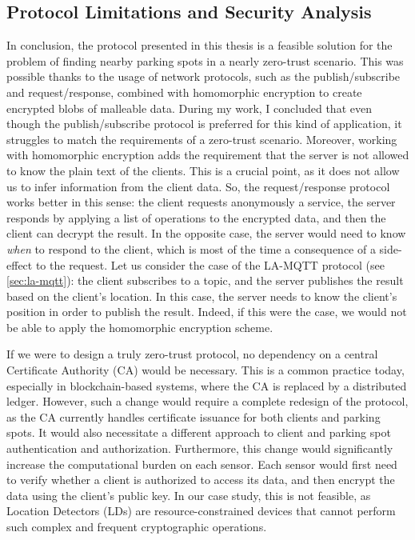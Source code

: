 \subsection{Protocol Limitations and Security Analysis}

In conclusion, the protocol presented in this thesis is a feasible solution for the problem of finding nearby parking spots in a nearly zero-trust scenario. This was possible thanks to the usage of network protocols, such as the publish/subscribe and request/response, combined with homomorphic encryption to create encrypted blobs of malleable data. 
During my work, I concluded that even though the publish/subscribe protocol is preferred for this kind of application, it struggles to match the requirements of a zero-trust scenario. Moreover, working with homomorphic encryption adds the requirement that the server is not allowed to know the plain text of the clients. This is a crucial point, as it does not allow us to infer information from the client data. So, the request/response protocol works better in this sense: the client requests anonymously a service, the server responds by applying a list of operations to the encrypted data, and then the client can decrypt the result. In the opposite case, the server would need to know \emph{when} to respond to the client, which is most of the time a consequence of a side-effect to the request. Let us consider the case of the LA-MQTT protocol (see \cref{sec:la-mqtt}): the client subscribes to a topic, and the server publishes the result based on the client's location. In this case, the server needs to know the client's position in order to publish the result. Indeed, if this were the case, we would not be able to apply the homomorphic encryption scheme.

If we were to design a truly zero-trust protocol, no dependency on a central Certificate Authority (CA) would be necessary. This is a common practice today, especially in blockchain-based systems, where the CA is replaced by a distributed ledger. However, such a change would require a complete redesign of the protocol, as the CA currently handles certificate issuance for both clients and parking spots. It would also necessitate a different approach to client and parking spot authentication and authorization.
Furthermore, this change would significantly increase the computational burden on each sensor. Each sensor would first need to verify whether a client is authorized to access its data, and then encrypt the data using the client’s public key. In our case study, this is not feasible, as Location Detectors (LDs) are resource-constrained devices that cannot perform such complex and frequent cryptographic operations.

